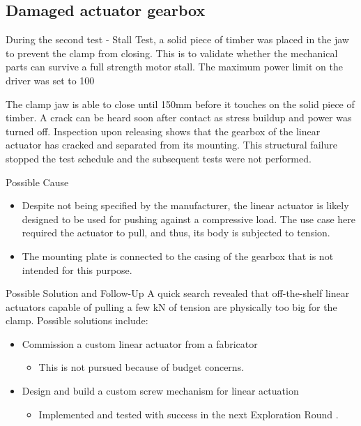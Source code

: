 \subsection{Damaged actuator gearbox}
\label{subsection:exploration-1-damaged-actuator-gearbox}

During the second test - Stall Test, a solid piece of timber was placed in the jaw to prevent the clamp from closing. This is to validate whether the mechanical parts can survive a full strength motor stall. The maximum power limit on the driver was set to 100%

The clamp jaw is able to close until 150mm before it touches on the solid piece of timber. A crack can be heard soon after contact as stress buildup and power was turned off. Inspection upon releasing shows that the gearbox of the linear actuator has cracked and separated from its mounting. This structural failure stopped the test schedule and the subsequent tests were not performed.

Possible Cause
\begin{itemize}
    \item Despite not being specified by the manufacturer, the linear actuator is likely designed to be used for pushing against a compressive load. The use case here required the actuator to pull, and thus, its body is subjected to tension. 
    \item The mounting plate is connected to the casing of the gearbox that is not intended for this purpose.
\end{itemize}

    Possible Solution and Follow-Up
A quick search revealed that off-the-shelf linear actuators capable of pulling a few kN of tension are physically too big for the clamp. Possible solutions include:
\begin{itemize}
    \item Commission a custom linear actuator from a fabricator
    \begin{itemize}
        \item This is not pursued because of budget concerns.
    \end{itemize}
    \item Design and build a custom screw mechanism for linear actuation
    \begin{itemize}
        \item Implemented and tested with success in the next Exploration Round . 
    \end{itemize}
\end{itemize}

